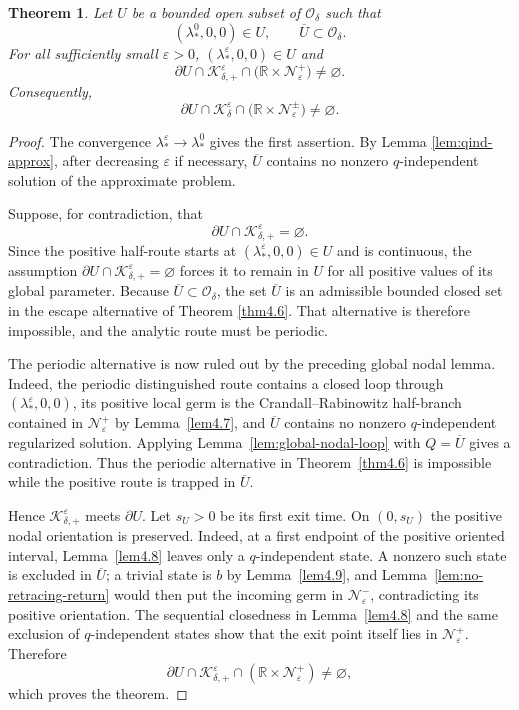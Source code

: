 \documentclass[11pt,reqno]{amsart}
\numberwithin{equation}{section}
\newtheorem{theorem}{Theorem}[section]
\theoremstyle{definition}
\theoremstyle{remark}
\begin{document}
\begin{theorem}\label{thm4.10}
Let $U$ be a bounded open subset of $\mathcal O_\delta$ such that
\[
 (\lambda_*^0,0,0)\in U,
 \qquad \overline U\subset\mathcal O_\delta.
\]
For all sufficiently small $\varepsilon>0$,
$(\lambda_*^\varepsilon,0,0)\in U$ and
\[
 \partial U\cap\mathcal K_{\delta,+}^\varepsilon
 \cap\bigl(\mathbb R\times\mathcal N_\varepsilon^+\bigr)
 \neq\varnothing.
\]
Consequently,
\[
 \partial U\cap\mathcal K_\delta^\varepsilon
 \cap\bigl(\mathbb R\times\mathcal N_\varepsilon^{\pm}\bigr)
 \neq\varnothing.
\]
\end{theorem}
\begin{proof}
The convergence $\lambda_*^\varepsilon\to\lambda_*^0$ gives the
first assertion.  By Lemma \ref{lem:qind-approx}, after decreasing
$\varepsilon$ if necessary, $\overline U$ contains no nonzero
$q$-independent solution of the approximate problem.

Suppose, for contradiction, that
\[
 \partial U\cap\mathcal K_{\delta,+}^\varepsilon=\varnothing.
\]
Since the positive half-route starts at
$(\lambda_*^\varepsilon,0,0)\in U$ and is continuous, the assumption
$\partial U\cap\mathcal K_{\delta,+}^\varepsilon=\varnothing$ forces
it to remain in $U$ for all positive values of its global parameter.
Because $\overline U\subset\mathcal O_\delta$, the set
$\overline U$ is an admissible bounded closed set in the escape
alternative of Theorem \ref{thm4.6}.  That alternative is therefore
impossible, and the analytic route must be periodic.

The periodic alternative is now ruled out by the preceding global
nodal lemma.  Indeed, the periodic distinguished route contains a
closed loop through $(\lambda_*^\varepsilon,0,0)$, its positive local
germ is the Crandall--Rabinowitz half-branch contained in
$\mathcal N_\varepsilon^+$ by Lemma~\ref{lem4.7}, and
$\overline U$ contains no nonzero $q$-independent regularized
solution.  Applying Lemma~\ref{lem:global-nodal-loop} with
$Q=\overline U$ gives a contradiction.  Thus the periodic
alternative in Theorem~\ref{thm4.6} is impossible while the positive
route is trapped in $\overline U$.

Hence $\mathcal K_{\delta,+}^\varepsilon$ meets $\partial U$.
Let $s_U>0$ be its first exit time.  On $(0,s_U)$ the positive nodal
orientation is preserved.  Indeed, at a first endpoint of the
positive oriented interval, Lemma~\ref{lem4.8} leaves only a
$q$-independent state.  A nonzero such state is excluded in
$\overline U$; a trivial state is $b$ by Lemma~\ref{lem4.9}, and
Lemma~\ref{lem:no-retracing-return} would then put the incoming germ
in $\mathcal N_\varepsilon^-$, contradicting its positive
orientation.  The sequential closedness in Lemma~\ref{lem4.8} and
the same exclusion of $q$-independent states show that the exit point
itself lies in $\mathcal N_\varepsilon^+$.  Therefore
\[
 \partial U\cap\mathcal K_{\delta,+}^\varepsilon
 \cap(\mathbb R\times\mathcal N_\varepsilon^+)\ne\varnothing,
\]
which proves the theorem.
\end{proof}
\end{document}
